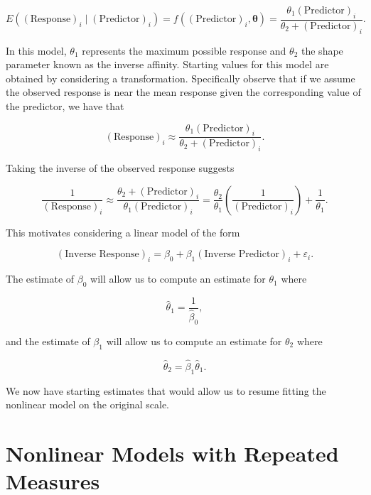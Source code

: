 \documentclass[
  letterpaper,
  DIV=11,
  numbers=noendperiod]{scrreprt}
\theoremstyle{definition}
\theoremstyle{definition}
\theoremstyle{remark}
\begin{document}
\[E\left((\text{Response})_i \mid (\text{Predictor})_i\right) = f\left((\text{Predictor})_i, \boldsymbol{\theta}\right) = \frac{\theta_1 (\text{Predictor})_i}{\theta_2 + (\text{Predictor})_i}.\]

In this model, \(\theta_1\) represents the maximum possible response and
\(\theta_2\) the shape parameter known as the inverse affinity. Starting
values for this model are obtained by considering a transformation.
Specifically observe that if we assume the observed response is near the
mean response given the corresponding value of the predictor, we have
that

\[(\text{Response})_i \approx \frac{\theta_1 (\text{Predictor})_i}{\theta_2 + (\text{Predictor})_i}.\]

Taking the inverse of the observed response suggests

\[\frac{1}{(\text{Response})_i} \approx \frac{\theta_2 + (\text{Predictor})_i}{\theta_1 (\text{Predictor})_i} = \frac{\theta_2}{\theta_1} \left(\frac{1}{(\text{Predictor})_i}\right) + \frac{1}{\theta_1}.\]

This motivates considering a linear model of the form

\[(\text{Inverse Response})_i = \beta_0 + \beta_1 (\text{Inverse Predictor})_i + \varepsilon_i.\]

The estimate of \(\beta_0\) will allow us to compute an estimate for
\(\theta_1\) where

\[\widehat{\theta}_1 = \frac{1}{\widehat{\beta}_0},\]

and the estimate of \(\beta_1\) will allow us to compute an estimate for
\(\theta_2\) where

\[\widehat{\theta}_2 = \widehat{\beta}_1 \widehat{\theta}_1.\]

We now have starting estimates that would allow us to resume fitting the
nonlinear model on the original scale.

\hypertarget{sec-nlm-rm}{%
\chapter{Nonlinear Models with Repeated Measures}\label{sec-nlm-rm}}

\providecommand{\norm}[1]{\left\lVert#1\right\rVert}
\providecommand{\abs}[1]{\left\lvert#1\right\rvert}
\providecommand{\dist}[1]{\stackrel{\text{#1}}{\sim}}
\providecommand{\ind}[1]{\mathbb{I}\left(#1\right)}
\providecommand{\bm}[1]{\mathbf{#1}}
\providecommand{\bs}[1]{\boldsymbol{#1}}
\providecommand{\Ell}{\mathcal{L}}
\providecommand{\indep}{\perp\negthickspace\negmedspace\perp}
\end{document}
